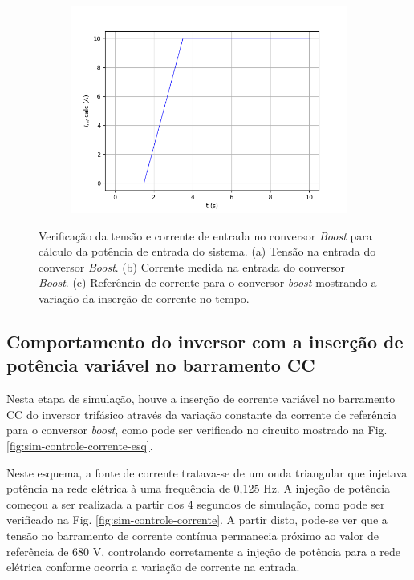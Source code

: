 \begin{figure}[!hbt]
\begin{subfigure}[b]{0.49\textwidth}
		\includegraphics[width=\textwidth]{figuras/sim_figures/inversor_e_boost/corrente_referencia_boost.png}
		\caption{}
	\end{subfigure}
	\caption{Verificação da tensão e corrente de entrada no conversor \textit{Boost} para cálculo da potência de entrada do sistema. (a) Tensão na entrada do conversor \textit{Boost}. (b) Corrente medida na entrada do conversor \textit{Boost}. (c) Referência de corrente para o conversor \textit{boost} mostrando a variação da inserção de corrente no tempo.}
    \label{fig:sim-tensao-corrente-boost}
\end{figure}

\subsection{Comportamento do inversor com a inserção de potência variável no barramento CC}

Nesta etapa de simulação, houve a inserção de corrente variável no barramento CC do 
inversor trifásico através da variação constante da corrente de referência para o conversor 
\textit{boost}, como pode ser verificado no circuito mostrado na Fig. \ref{fig:sim-controle-corrente-esq}.

Neste esquema, a fonte de corrente tratava-se de um onda triangular que injetava potência 
na rede elétrica à uma frequência de 0,125 Hz. A injeção de potência começou a ser realizada 
a partir dos 4 segundos de simulação, como pode ser verificado na Fig. 
\ref{fig:sim-controle-corrente}. A partir disto, pode-se ver que a tensão no barramento de 
corrente contínua permanecia próximo ao valor de referência de 680 V, controlando corretamente
a injeção de potência para a rede elétrica conforme ocorria a variação de corrente na entrada.

